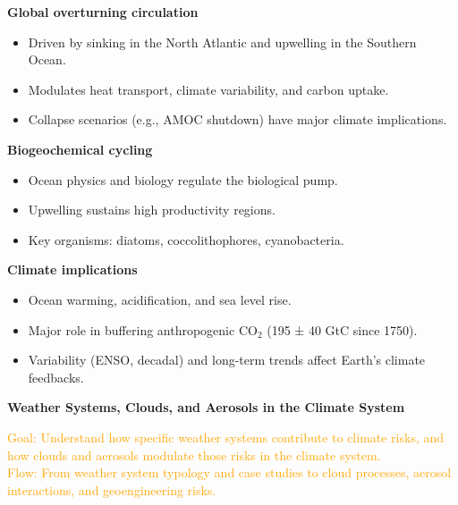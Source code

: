 \documentclass[fontsize=8pt, a4paper, landscape, fleqn]{scrartcl}
\renewcommand{\section}[1]{%
    \noindent\colorbox{sectioncolor}{%
        \parbox{\dimexpr\columnwidth-2\fboxsep}{\color{white}\textbf{#1}}}%
    \vspace{0.5mm}%
}
\renewcommand{\subsection}[1]{%
    \noindent\colorbox{subsectioncolor}{%
        \parbox{\dimexpr\columnwidth-2\fboxsep}{\color{white}\textbf{#1}}}%
    \vspace{0.5mm}%
}
\begin{document}
\begin{multicols*}{3}[\raggedcolumns]
\subsection{Global overturning circulation}
\begin{itemize}
    \item Driven by sinking in the North Atlantic and upwelling in the Southern Ocean.
    \item Modulates heat transport, climate variability, and carbon uptake.
    \item Collapse scenarios (e.g., AMOC shutdown) have major climate implications.
\end{itemize}

\subsection{Biogeochemical cycling}
\begin{itemize}
    \item Ocean physics and biology regulate the biological pump.
    \item Upwelling sustains high productivity regions.
    \item Key organisms: diatoms, coccolithophores, cyanobacteria.
\end{itemize}

\subsection{Climate implications}
\begin{itemize}
    \item Ocean warming, acidification, and sea level rise.
    \item Major role in buffering anthropogenic CO$_2$ (195 ± 40 GtC since 1750).
    \item Variability (ENSO, decadal) and long-term trends affect Earth’s climate feedbacks.
\end{itemize}

\section{Weather Systems, Clouds, and Aerosols in the Climate System}
\noindent\textcolor{orange}{
Goal: Understand how specific weather systems contribute to climate risks, and how clouds and aerosols modulate those risks in the climate system.\\
Flow: From weather system typology and case studies to cloud processes, aerosol interactions, and geoengineering risks.
}


\end{multicols*}
\end{document}
